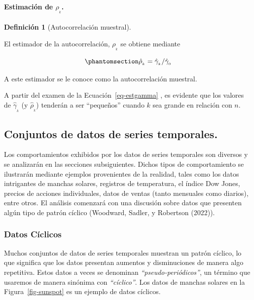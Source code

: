 \documentclass[
  us-letterpaper,
]{scrreprt}
\let\oldparagraph\paragraph
\renewcommand{\paragraph}[1]{\oldparagraph{#1}\mbox{}}
\theoremstyle{definition}
\theoremstyle{plain}
\theoremstyle{plain}
\theoremstyle{definition}
\newtheorem{definition}{Definición}[chapter]
\theoremstyle{remark}
\begin{document}
\paragraph{\texorpdfstring{Estimación de
\(\rho_{_k}\).}{Estimación de \textbackslash rho\_\{\_k\}.}}\label{estimaciuxf3n-de-rho__k.}

\begin{definition}[Autocorrelación
muestral]\protect\hypertarget{def-samplecorr}{}\label{def-samplecorr}

El estimador de la autocorrelación, \(\rho_{_{k}}\) se obtiene mediante

\begin{equation}\phantomsection\label{eq-sampleautocor}{
\hat\rho_{_{k}}=\hat\gamma_{_{k}}/\hat\gamma_{_{0}}
}\end{equation}

A este estimador se le conoce como la autocorrelación muestral.

\end{definition}

A partir del examen de la Ecuación~\ref{eq-estgamma} , es evidente que
los valores de \(\hat\gamma_{_{k}}\) (y \(\hat\rho_{_{k}}\)) tenderán a
ser ``pequeños'' cuando \(k\) sea grande en relación con \(n\).

\subsection{Conjuntos de datos de series
temporales.}\label{conjuntos-de-datos-de-series-temporales.}

Los comportamientos exhibidos por los datos de series temporales son
diversos y se analizarán en las secciones subsiguientes. Dichos tipos de
comportamiento se ilustrarán mediante ejemplos provenientes de la
realidad, tales como los datos intrigantes de manchas solares, registros
de temperatura, el índice Dow Jones, precios de acciones individuales,
datos de ventas (tanto mensuales como diarios), entre otros. El análisis
comenzará con una discusión sobre datos que presenten algún tipo de
patrón cíclico (Woodward, Sadler, y Robertson (2022)).

\subsubsection{Datos Cíclicos}\label{datos-cuxedclicos}

Muchos conjuntos de datos de series temporales muestran un patrón
cíclico, lo que significa que los datos presentan aumentos y
disminuciones de manera algo repetitiva. Estos datos a veces se
denominan \emph{``pseudo-periódicos''}, un término que usaremos de
manera sinónima con \emph{``cíclico''}. Los datos de manchas solares en
la Figura~\ref{fig-sunspot} es un ejemplo de datos cíclicos.
\end{document}
